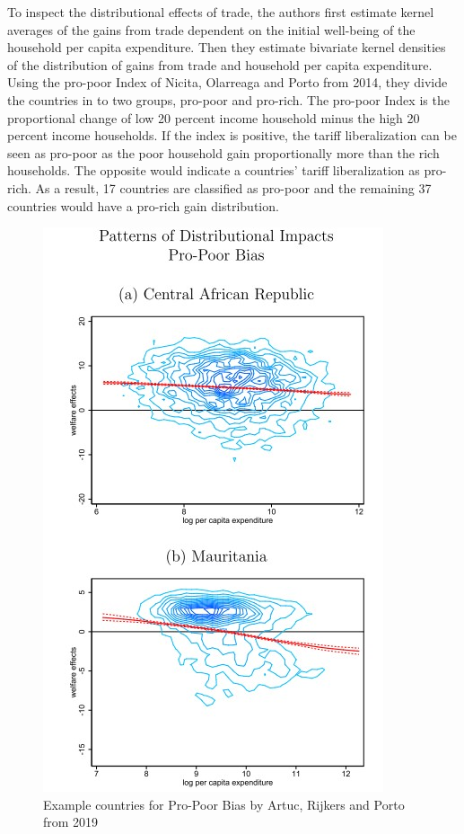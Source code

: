To inspect the distributional effects of trade, the authors first estimate kernel averages of the gains from trade dependent on
the initial well-being of the household per capita expenditure. Then they estimate bivariate kernel densities of the distribution
of gains from trade and household per capita expenditure. Using the pro-poor Index of Nicita, Olarreaga and Porto from 2014,
they divide the countries in to two groups, pro-poor and pro-rich. The pro-poor Index is the proportional change of low
20 percent income household minus the high 20 percent income households. If the index is positive, the tariff liberalization
can be seen as pro-poor as the poor household gain proportionally more than the rich households. The opposite would indicate
a countries' tariff liberalization as pro-rich. As a result, 17 countries are classified as pro-poor and the remaining 37 countries
would have a pro-rich gain distribution.
\begin{figure}[h!]
    \centering
    \includegraphics*[scale=0.5]{graphics/propoor.jpg}
    \caption{Example countries for Pro-Poor Bias by Artuc, Rijkers and Porto from 2019}
    \label{fig:propoor}
\end{figure}\\

